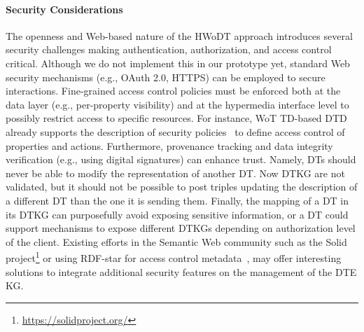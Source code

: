 \paragraph{Security Considerations}
The openness and Web-based nature of the \ac{HWoDT} approach introduces several security challenges making authentication, authorization, and access control critical.
Although we do not implement this in our prototype yet, standard Web security mechanisms (e.g., OAuth 2.0, HTTPS) can be employed to secure interactions.
Fine-grained access control policies must be enforced both at the data layer (e.g., per-property visibility) and at the hypermedia interface level to possibly restrict access to specific resources.
For instance, \ac{WoT} \ac{TD}-based \ac{DTD} already supports the description of security policies~\cite{wotthing} to define access control of properties and actions. 
Furthermore, provenance tracking and data integrity verification (e.g., using digital signatures) can enhance trust. Namely, \acp{DT} should never be able to modify the representation of another \ac{DT}. Now \ac{DTKG} are not validated, but it should not be possible to post triples updating the description of a different \ac{DT} than the one it is sending them.
Finally, the mapping of a \ac{DT} in its \ac{DTKG} can purposefully avoid exposing sensitive information, or a \ac{DT} could support mechanisms to expose different \acp{DTKG} depending on authorization level of the client.
Existing efforts in the Semantic Web community such as the Solid project\footnote{\url{https://solidproject.org/}} or using RDF-star for access control metadata~\cite{rdfstar-security}, may offer interesting solutions to integrate additional security features on the management of the \ac{DTE} \ac{KG}. 


